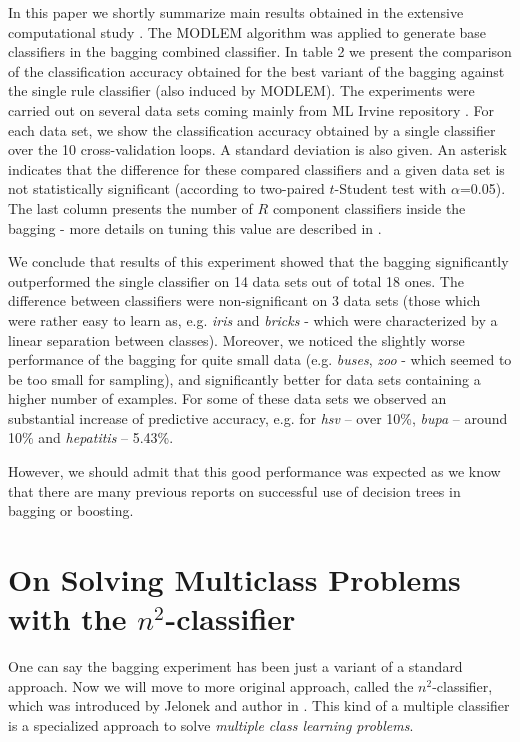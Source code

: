 \documentclass{llncs}
\begin{document}
In this paper we shortly summarize main results obtained in the extensive
computational study \cite{Uppsala}.  The MODLEM algorithm was applied to
generate base classifiers in the bagging combined classifier. In table 2
 we present the comparison of the classification accuracy
obtained for the best variant of the bagging against the single rule
classifier (also induced by MODLEM). The experiments were carried out on
several data sets coming mainly from ML Irvine repository \cite{irvine}. For
each data set, we show the classification accuracy obtained by a single
classifier over the 10 cross-validation loops. A standard deviation is also
given. An asterisk indicates that the difference for these compared
classifiers and a given data set is not statistically significant (according
to two-paired $t$-Student test with $\alpha$=0.05). The last column presents
the number of $R$ component classifiers inside the bagging - more details on
tuning this value are described in \cite{Uppsala}.

We conclude that  results of this experiment showed that the bagging
significantly outperformed the single classifier on 14 data sets out of
total 18 ones. The difference between classifiers were non-significant on 3
data sets (those which were rather easy to learn as, e.g. {\em iris} and
{\em bricks} - which were characterized by a linear separation between
classes). Moreover, we  noticed the slightly worse performance of the
bagging for quite small data (e.g. \emph{ buses}, \emph{zoo} - which seemed
to be too small for sampling), and significantly better  for data sets
containing a higher number of examples. For some of these data sets we
observed an substantial increase of predictive accuracy, e.g. for {\em hsv}
-- over 10\%, {\em bupa} -- around 10\% and {\em hepatitis} -- 5.43\%.

However, we should admit that this good performance was expected as we know
that there are many previous reports on successful use of decision trees in
bagging or boosting.



\section{On Solving Multiclass Problems with the $n^2$-classifier}

One can say the bagging experiment has been just a variant of a standard
approach. Now we will move to more original approach, called the
$n^2$-classifier, which was introduced by Jelonek and author in
\cite{JelStef98,Stef01}. This kind of a multiple classifier is a specialized
approach to solve {\em multiple class learning problems}.
\end{document}
